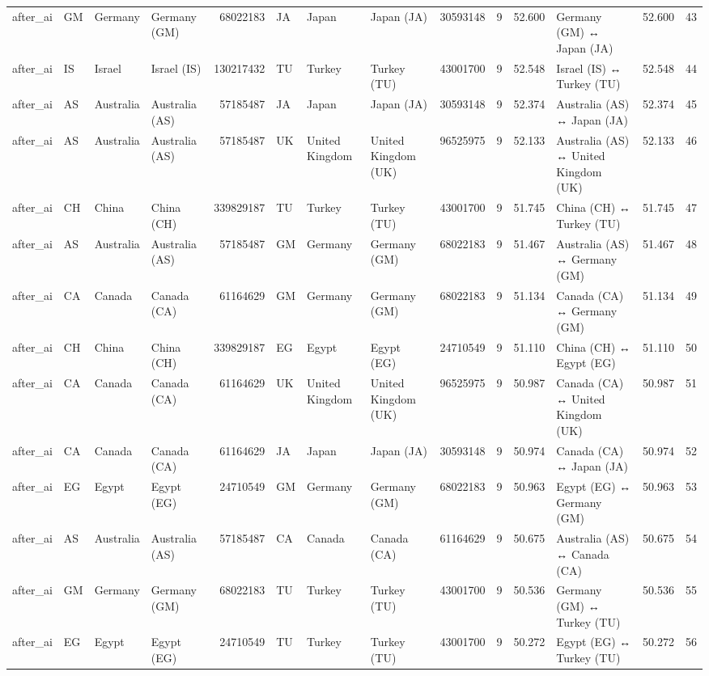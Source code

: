 \begin{tabular}{llllrlllrrrlrr}
after\_ai & GM & Germany & Germany (GM) & 68022183 & JA & Japan & Japan (JA) & 30593148 & 9 & 52.600 & Germany (GM) ↔ Japan (JA) & 52.600 & 43 \\
after\_ai & IS & Israel & Israel (IS) & 130217432 & TU & Turkey & Turkey (TU) & 43001700 & 9 & 52.548 & Israel (IS) ↔ Turkey (TU) & 52.548 & 44 \\
after\_ai & AS & Australia & Australia (AS) & 57185487 & JA & Japan & Japan (JA) & 30593148 & 9 & 52.374 & Australia (AS) ↔ Japan (JA) & 52.374 & 45 \\
after\_ai & AS & Australia & Australia (AS) & 57185487 & UK & United Kingdom & United Kingdom (UK) & 96525975 & 9 & 52.133 & Australia (AS) ↔ United Kingdom (UK) & 52.133 & 46 \\
after\_ai & CH & China & China (CH) & 339829187 & TU & Turkey & Turkey (TU) & 43001700 & 9 & 51.745 & China (CH) ↔ Turkey (TU) & 51.745 & 47 \\
after\_ai & AS & Australia & Australia (AS) & 57185487 & GM & Germany & Germany (GM) & 68022183 & 9 & 51.467 & Australia (AS) ↔ Germany (GM) & 51.467 & 48 \\
after\_ai & CA & Canada & Canada (CA) & 61164629 & GM & Germany & Germany (GM) & 68022183 & 9 & 51.134 & Canada (CA) ↔ Germany (GM) & 51.134 & 49 \\
after\_ai & CH & China & China (CH) & 339829187 & EG & Egypt & Egypt (EG) & 24710549 & 9 & 51.110 & China (CH) ↔ Egypt (EG) & 51.110 & 50 \\
after\_ai & CA & Canada & Canada (CA) & 61164629 & UK & United Kingdom & United Kingdom (UK) & 96525975 & 9 & 50.987 & Canada (CA) ↔ United Kingdom (UK) & 50.987 & 51 \\
after\_ai & CA & Canada & Canada (CA) & 61164629 & JA & Japan & Japan (JA) & 30593148 & 9 & 50.974 & Canada (CA) ↔ Japan (JA) & 50.974 & 52 \\
after\_ai & EG & Egypt & Egypt (EG) & 24710549 & GM & Germany & Germany (GM) & 68022183 & 9 & 50.963 & Egypt (EG) ↔ Germany (GM) & 50.963 & 53 \\
after\_ai & AS & Australia & Australia (AS) & 57185487 & CA & Canada & Canada (CA) & 61164629 & 9 & 50.675 & Australia (AS) ↔ Canada (CA) & 50.675 & 54 \\
after\_ai & GM & Germany & Germany (GM) & 68022183 & TU & Turkey & Turkey (TU) & 43001700 & 9 & 50.536 & Germany (GM) ↔ Turkey (TU) & 50.536 & 55 \\
after\_ai & EG & Egypt & Egypt (EG) & 24710549 & TU & Turkey & Turkey (TU) & 43001700 & 9 & 50.272 & Egypt (EG) ↔ Turkey (TU) & 50.272 & 56 \\

\end{tabular}
